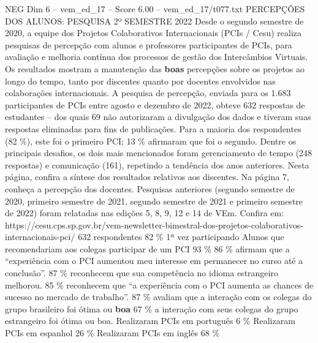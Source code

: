 \begin{textsample}{NEG Dim 6 – vem\_ed\_17 – Score 6.00 – vem\_ed\_17/t077.txt}  \label{ex:f6_neg_124}
PERCEPÇÕES DOS ALUNOS: PESQUISA 2º SEMESTRE 2022 Desde o segundo semestre de 2020, a equipe dos Projetos Colaborativos Internacionais (PCIs / Cesu) realiza pesquisas de percepção com alunos e professores participantes de PCIs, para avaliação e melhoria contínua dos processos de gestão dos Intercâmbios Virtuais.
Os resultados mostram a manutenção das \textbf{boas} percepções sobre os projetos ao longo do tempo, tanto por discentes quanto por docentes envolvidos nas colaborações internacionais.
A pesquisa de percepção, enviada para os 1.683 participantes de PCIs entre agosto e dezembro de 2022, obteve 632 respostas de estudantes – dos quais 69 não autorizaram a divulgação dos dados e tiveram suas respostas eliminadas para fins de publicações.
Para a maioria dos respondentes (82 \%), este foi o primeiro PCI; 13 \% afirmaram que foi o segundo.
Dentre os principais desafios, os dois mais mencionados foram gerenciamento de tempo (248 respostas) e comunicação (161), repetindo a tendência dos anos anteriores.
Nesta página, confira a síntese dos resultados relativos aos discentes.
Na página 7, conheça a percepção dos docentes.
Pesquisas anteriores (segundo semestre de 2020, primeiro semestre de 2021, segundo semestre de 2021 e primeiro semestre de 2022) foram relatadas nas edições 5, 8, 9, 12 e 14 de VEm.
Confira em: https://cesu.cps.sp.gov.br/vem-newsletter-bimestral-dos-projetos-colaborativos-internacionais-pci/ 632 respondentes 82 \% 1ª vez participando Alunos que recomendariam aos colegas participar de um PCI 93 \% 86 \% afirmam que a “experiência com o PCI aumentou meu interesse em permanecer no curso até a conclusão”. 87 \% reconhecem que sua competência no idioma estrangeiro melhorou. 85 \% reconhecem que “a experiência com o PCI aumenta as chances de sucesso no mercado de trabalho”. 87 \% avaliam que a interação com os colegas do grupo brasileiro foi ótima ou \textbf{boa} 67 \% a interação com seus colegas do grupo estrangeiro foi ótima ou boa.
Realizaram PCIs em português 6 \% Realizaram PCIs em espanhol 26 \% Realizaram PCIs em inglês 68 \%

\end{textsample}
